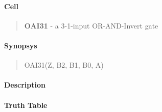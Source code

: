 \label{OAI31}
\paragraph{Cell}
\begin{quote}
    \textbf{OAI31} - a 3-1-input OR-AND-Invert gate
\end{quote}

\paragraph{Synopsys}
\begin{quote}
    OAI31(Z, B2, B1, B0, A)
\end{quote}

\paragraph{Description}

%

\paragraph{Truth Table}


